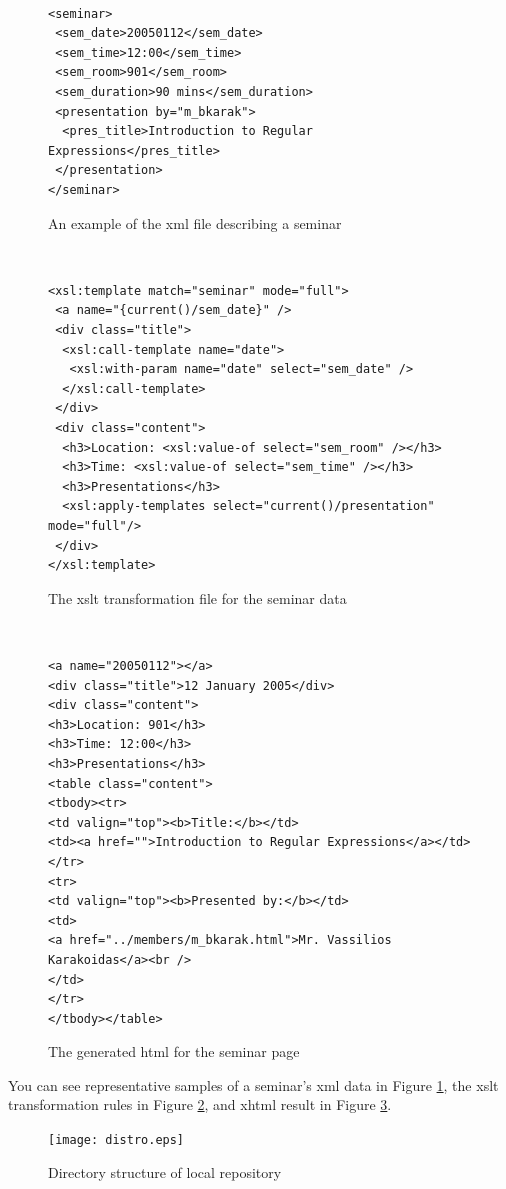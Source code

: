 \documentclass{elsart}
\begin{document}
\begin{figure}
{\small \tt%
\begin{verbatim}
<seminar>
 <sem_date>20050112</sem_date>
 <sem_time>12:00</sem_time>
 <sem_room>901</sem_room>
 <sem_duration>90 mins</sem_duration>
 <presentation by="m_bkarak">
  <pres_title>Introduction to Regular Expressions</pres_title>
 </presentation>
</seminar>
\end{verbatim}
}
\caption{An example of the {\sc xml} file describing a seminar}
\label{fig:project-xml}
\end{figure}

\begin{figure}
{\small \tt%
\begin{verbatim}
<xsl:template match="seminar" mode="full">
 <a name="{current()/sem_date}" />
 <div class="title">
  <xsl:call-template name="date">
   <xsl:with-param name="date" select="sem_date" />
  </xsl:call-template>
 </div>
 <div class="content">
  <h3>Location: <xsl:value-of select="sem_room" /></h3>
  <h3>Time: <xsl:value-of select="sem_time" /></h3>
  <h3>Presentations</h3>
  <xsl:apply-templates select="current()/presentation" mode="full"/>
 </div>
</xsl:template>
\end{verbatim}
}
\caption{The {\sc xslt} transformation file for the seminar data}
\label{fig:project-xslt}
\end{figure}

\begin{figure}
{\small \tt%
\begin{verbatim}
<a name="20050112"></a>
<div class="title">12 January 2005</div>
<div class="content">
<h3>Location: 901</h3>
<h3>Time: 12:00</h3>
<h3>Presentations</h3>
<table class="content">
<tbody><tr>
<td valign="top"><b>Title:</b></td>
<td><a href="">Introduction to Regular Expressions</a></td>
</tr>
<tr>
<td valign="top"><b>Presented by:</b></td>
<td>
<a href="../members/m_bkarak.html">Mr. Vassilios Karakoidas</a><br />
</td>
</tr>
</tbody></table>
\end{verbatim}
}
\caption{The generated {\sc html} for the seminar page}
\label{fig:project-html}
\end{figure}

You can see representative samples of a seminar's
{\sc xml} data in Figure \ref{fig:project-xml}, the
{\sc xslt} transformation rules in Figure \ref{fig:project-xslt},
and {\sc xhtml} result in Figure \ref{fig:project-html}.

\begin{figure}
\texttt{[image: distro.eps]}
\caption{Directory structure of local repository}
\label{fig:eltrun-web-distro}
\end{figure}
\end{document}
